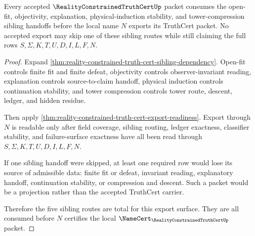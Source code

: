 \begin{theorem}
\label{thm:reality-constrained-truth-cert-sibling-handoff-totality}
Every accepted $\RealityConstrainedTruthCertUp$ packet consumes the open-fit,
objectivity, explanation, physical-induction stability, and tower-compression
sibling handoffs before the local name $N$ exports its TruthCert packet. No
accepted export may skip one of these sibling routes while still claiming the
full rows $S,\Sigma,K,T,U,D,I,L,F,N$.
\end{theorem}
\begin{proof}
Expand \autoref{thm:reality-constrained-truth-cert-sibling-dependency}. Open-fit
controls finite fit and finite defeat, objectivity controls observer-invariant
reading, explanation controls source-to-claim handoff, physical induction
controls continuation stability, and tower compression controls tower route,
descent, ledger, and hidden residue.

Then apply \autoref{thm:reality-constrained-truth-cert-export-readiness}. Export
through $N$ is readable only after field coverage, sibling routing, ledger
exactness, classifier stability, and failure-surface exactness have all been read
through $S,\Sigma,K,T,U,D,I,L,F,N$.

If one sibling handoff were skipped, at least one required row would lose its
source of admissible data: finite fit or defeat, invariant reading, explanatory
handoff, continuation stability, or compression and descent. Such a packet would
be a projection rather than the accepted TruthCert carrier.

Therefore the five sibling routes are total for this export surface. They are all
consumed before $N$ certifies the local $\NameCert_{\RealityConstrainedTruthCertUp}$
packet.
\end{proof}

